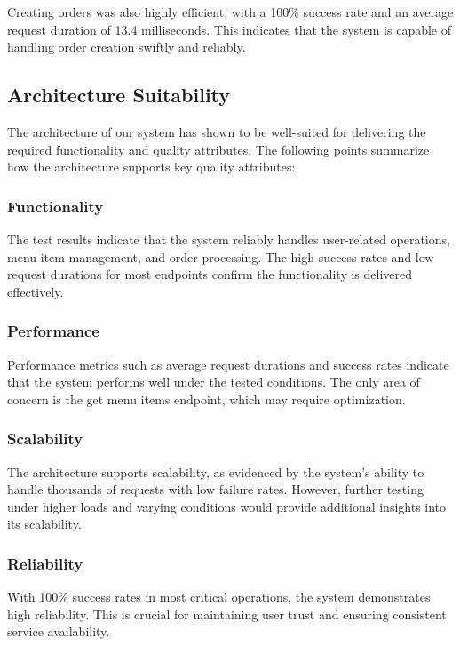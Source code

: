 \documentclass{article}
\begin{document}
Creating orders was also highly efficient, with a 100\% success rate and an average request duration of 13.4 milliseconds. This indicates that the system is capable of handling order creation swiftly and reliably.

\subsection{Architecture Suitability}
The architecture of our system has shown to be well-suited for delivering the required functionality and quality attributes. The following points summarize how the architecture supports key quality attributes:

\subsubsection*{Functionality}
The test results indicate that the system reliably handles user-related operations, menu item management, and order processing. The high success rates and low request durations for most endpoints confirm the functionality is delivered effectively.

\subsubsection*{Performance}
Performance metrics such as average request durations and success rates indicate that the system performs well under the tested conditions. The only area of concern is the get menu items endpoint, which may require optimization.

\subsubsection*{Scalability}
The architecture supports scalability, as evidenced by the system's ability to handle thousands of requests with low failure rates. However, further testing under higher loads and varying conditions would provide additional insights into its scalability.

\subsubsection*{Reliability}
With 100\% success rates in most critical operations, the system demonstrates high reliability. This is crucial for maintaining user trust and ensuring consistent service availability.
\end{document}
